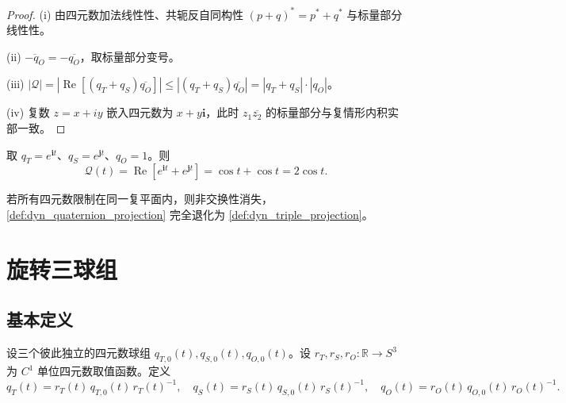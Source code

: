 \begin{proof}
(i) 由四元数加法线性性、共轭反自同构性 $(p+q)^* = p^*+q^*$ 与标量部分线性性。

(ii) $\overline{-q_O}=-\overline{q_O}$，取标量部分变号。

(iii) $|\mathcal Q|=|\operatorname{Re}[(q_T+q_S)\overline{q_O}]|\le|(q_T+q_S)\overline{q_O}|=|q_T+q_S|\cdot|q_O|$。

(iv) 复数 $z=x+iy$ 嵌入四元数为 $x+y\mathbf i$，此时 $z_1\overline{z_2}$ 的标量部分与复情形内积实部一致。
\end{proof}

\begin{example}[单球组动态投影实例]\label{ex:dyn_quaternion_example}
取 $q_T=e^{\mathbf i t}$、$q_S=e^{\mathbf j t}$、$q_O=1$。则
\[
\mathcal Q(t)=\operatorname{Re}[e^{\mathbf i t}+e^{\mathbf j t}]=\cos t+\cos t=2\cos t.
\]
\end{example}

\begin{remark}[与复情形的对应]\label{rem:dyn_quaternion_complex_correspondence}
若所有四元数限制在同一复平面内，则非交换性消失，\cref{def:dyn_quaternion_projection} 完全退化为 \cref{def:dyn_triple_projection}。
\end{remark}

\section{旋转三球组}
\label{sec:dyn_quaternion_triple}

\subsection{基本定义}

\begin{definition}[旋转三球组]\label{def:dyn_rotating_quaternion_groups}
设三个彼此独立的四元数球组 $q_{T,0}(t),q_{S,0}(t),q_{O,0}(t)$。设 $r_T,r_S,r_O:\mathbb R\to S^3$ 为 $C^1$ 单位四元数取值函数。定义
\[
q_T(t)=r_T(t)\,q_{T,0}(t)\,r_T(t)^{-1},\quad
q_S(t)=r_S(t)\,q_{S,0}(t)\,r_S(t)^{-1},\quad
q_O(t)=r_O(t)\,q_{O,0}(t)\,r_O(t)^{-1}.
\]
\end{definition}

